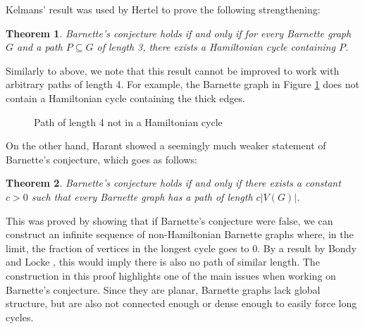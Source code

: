 \documentclass{scrartcl}
\theoremstyle{definition}
\theoremstyle{plain}
\newtheorem{theorem}{Theorem}
\begin{document}
Kelmans' result was used by Hertel \cite{hertel2005} to prove the following strengthening:

\begin{theorem}
    Barnette's conjecture holds if and only if for every Barnette graph $G$ and a path
    $P\subseteq G$ of length 3, there exists a Hamiltonian cycle containing $P$.
\end{theorem}

Similarly to above, we note that this result cannot be improved to work with arbitrary paths of
length 4. For example, the Barnette graph in Figure \ref{fig:path of length 4} does not contain a
Hamiltonian cycle containing the thick edges.

\begin{figure}[h]
    \centering

    \caption{Path of length 4 not in a Hamiltonian cycle}
    \label{fig:path of length 4}
\end{figure}

On the other hand, Harant \cite{Harant2013-nn} showed a seemingly much weaker statement of
Barnette's conjecture, which goes as follows:

\begin{theorem}
    Barnette's conjecture holds if and only if there exists a constant $c>0$ such that every
    Barnette graph has a path of length $c\lvert V(G)\rvert$.
\end{theorem}

This was proved by showing that if Barnette's conjecture were false, we can construct an infinite
sequence of non-Hamiltonian Barnette graphs where, in the limit, the fraction of vertices in the
longest cycle goes to 0.
By a result by Bondy and Locke \cite{Bondy1981-lt}, this would imply there is also no path of
similar length.
The construction in this proof highlights one of the main issues when working on Barnette's
conjecture.
Since they are planar, Barnette graphs lack global structure, but are also not connected enough or
dense enough to easily force long cycles.
\end{document}

